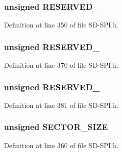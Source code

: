 \subsubsection[{R\+E\+S\+E\+R\+V\+E\+D\+\_\+1}]{\setlength{\rightskip}{0pt plus 5cm}unsigned R\+E\+S\+E\+R\+V\+E\+D\+\_}\label{union_c_s_d_a4b738029ab14d09fb361dad2e4994434}


Definition at line 350 of file S\+D-\/\+S\+P\+I.\+h.

\hypertarget{union_c_s_d_a0355b4ff187083c03ad04186cb91f7f4}{}
\subsubsection[{R\+E\+S\+E\+R\+V\+E\+D\+\_\+2}]{\setlength{\rightskip}{0pt plus 5cm}unsigned R\+E\+S\+E\+R\+V\+E\+D\+\_}\label{union_c_s_d_a0355b4ff187083c03ad04186cb91f7f4}


Definition at line 370 of file S\+D-\/\+S\+P\+I.\+h.

\hypertarget{union_c_s_d_aa1e2217b56977c022f83f82dda831d5f}{}
\subsubsection[{R\+E\+S\+E\+R\+V\+E\+D\+\_\+3}]{\setlength{\rightskip}{0pt plus 5cm}unsigned R\+E\+S\+E\+R\+V\+E\+D\+\_}\label{union_c_s_d_aa1e2217b56977c022f83f82dda831d5f}


Definition at line 381 of file S\+D-\/\+S\+P\+I.\+h.

\hypertarget{union_c_s_d_ad535ba65f4b82820b6b600ef822e69f3}{}
\subsubsection[{S\+E\+C\+T\+O\+R\+\_\+\+S\+I\+Z\+E}]{\setlength{\rightskip}{0pt plus 5cm}unsigned S\+E\+C\+T\+O\+R\+\_\+\+S\+I\+Z\+E}\label{union_c_s_d_ad535ba65f4b82820b6b600ef822e69f3}


Definition at line 360 of file S\+D-\/\+S\+P\+I.\+h.

